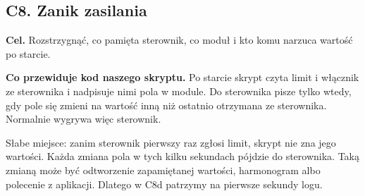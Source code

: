 \documentclass[11pt,a4paper]{article}
\begin{document}
\subsection{C8. Zanik zasilania}

\textbf{Cel.} Rozstrzygnąć, co pamięta sterownik, co moduł i kto komu narzuca wartość po starcie.


\textbf{Co przewiduje kod naszego skryptu.} Po starcie skrypt czyta limit i włącznik ze sterownika i nadpisuje nimi pola w module. Do sterownika pisze tylko wtedy, gdy pole się zmieni na wartość inną niż ostatnio otrzymana ze sterownika. Normalnie wygrywa więc sterownik.


Słabe miejsce: zanim sterownik pierwszy raz zgłosi limit, skrypt nie zna jego wartości. Każda zmiana pola w tych kilku sekundach pójdzie do sterownika. Taką zmianą może być odtworzenie zapamiętanej wartości, harmonogram albo polecenie z aplikacji. Dlatego w C8d patrzymy na pierwsze sekundy logu.
\end{document}
